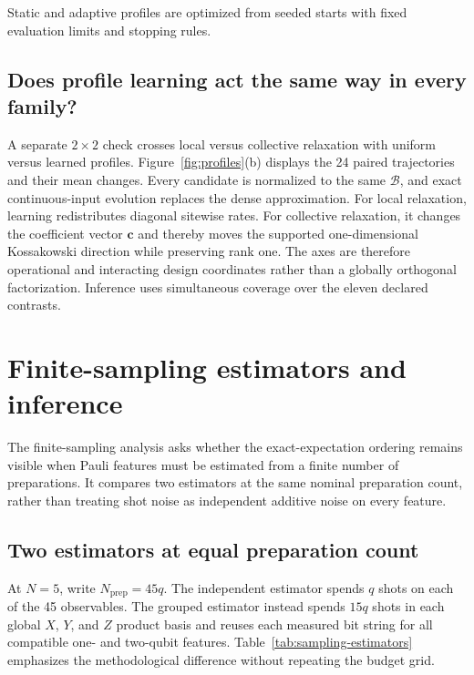 Static and adaptive profiles are optimized from seeded starts with fixed
evaluation limits and stopping rules.

\subsection{Does profile learning act the same way in every family?}

A separate \(2\times2\) check crosses local versus collective relaxation with
uniform versus learned profiles. Figure~\ref{fig:profiles}(b) displays the 24
paired trajectories and their mean changes.  Every candidate is normalized to
the same \(\mathcal B\), and exact continuous-input evolution replaces the dense
approximation.  For local relaxation, learning redistributes diagonal
sitewise rates.  For collective relaxation, it changes the coefficient vector
\(\boldsymbol c\) and thereby moves the supported one-dimensional
Kossakowski direction while preserving rank one.  The axes are therefore
operational and interacting design coordinates rather than a globally
orthogonal factorization. Inference uses simultaneous coverage over the eleven
declared contrasts.

\FloatBarrier
\section{Finite-sampling estimators and inference}
\label{app:experiment3}

The finite-sampling analysis asks whether the exact-expectation ordering remains
visible when Pauli features must be estimated from a finite number of
preparations.  It compares two estimators at the same nominal preparation
count, rather than treating shot noise as independent additive noise on every
feature.

\subsection{Two estimators at equal preparation count}

At \(N=5\), write \(N_{\mathrm{prep}}=45q\).  The independent estimator
spends \(q\) shots on each of the 45 observables.  The grouped estimator
instead spends \(15q\) shots in each global \(X\), \(Y\), and \(Z\) product
basis and reuses each measured bit string for all compatible one- and
two-qubit features.  Table~\ref{tab:sampling-estimators} emphasizes the
methodological difference without repeating the budget grid.

